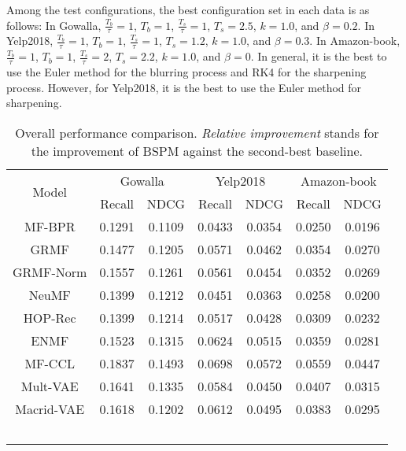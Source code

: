 \documentclass[sigconf,natbib=true]{acmart}
\begin{document}
Among the test configurations, the best configuration set in each data is as follows: In Gowalla, $\frac{T_b}{\tau} =1$, $T_b=1$, $\frac{T_s}{\tau}=1$, $T_s=2.5$,  $k=1.0$, and $\beta=0.2$. In Yelp2018, $\frac{T_b}{\tau} =1$, $T_b=1$, $\frac{T_s}{\tau}=1$, $T_s=1.2$, $k=1.0$, and $\beta=0.3$. In Amazon-book, $\frac{T_b}{\tau}=1$, $T_b=1$, $\frac{T_s}{\tau}=2$, $T_s=2.2$, $k=1.0$, and $\beta=0$. In general, it is the best to use the Euler method for the blurring process and RK4 for the sharpening process. However, for Yelp2018, it is the best to use the Euler method for sharpening.

\begin{table}[ht!]
    \small
    \setlength{\tabcolsep}{2pt}
    \centering
    \caption{Overall performance comparison. \textit{Relative improvement} stands for the improvement of BSPM against the second-best baseline.}
    \begin{tabular}{c cc cc cc}\toprule
        \multirow{2}{*}{Model}  & \multicolumn{2}{c}{Gowalla} & \multicolumn{2}{c}{Yelp2018} & \multicolumn{2}{c}{Amazon-book} \\ \cmidrule(lr){2-3}\cmidrule(lr){4-5}\cmidrule(lr){6-7}
                                & Recall & NDCG             & Recall & NDCG    & Recall & NDCG \\ \midrule
        MF-BPR                  & 0.1291 & 0.1109           & 0.0433 & 0.0354  & 0.0250 & 0.0196 \\
        GRMF                    & 0.1477 & 0.1205           & 0.0571 & 0.0462  & 0.0354 & 0.0270 \\
        GRMF-Norm               & 0.1557 & 0.1261           & 0.0561 & 0.0454  & 0.0352 & 0.0269 \\
        NeuMF                   & 0.1399 & 0.1212           & 0.0451 & 0.0363  & 0.0258 & 0.0200 \\
        HOP-Rec                 & 0.1399 & 0.1214           & 0.0517 & 0.0428  & 0.0309 & 0.0232 \\
        ENMF                    & 0.1523 & 0.1315           & 0.0624 & 0.0515  & 0.0359 & 0.0281 \\
        MF-CCL           & 0.1837 & 0.1493           & 0.0698 & 0.0572  & 0.0559 & 0.0447 \\\midrule
        Mult-VAE                & 0.1641 & 0.1335           & 0.0584 & 0.0450  & 0.0407 & 0.0315 \\
        Macrid-VAE              & 0.1618 & 0.1202           & 0.0612 & 0.0495  & 0.0383 & 0.0295 \\\

\end{tabular}
\end{table}
\end{document}
